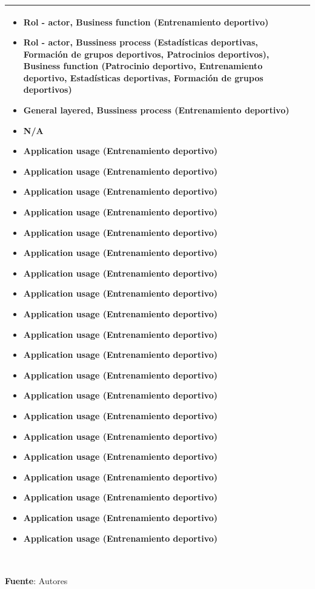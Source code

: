 \begin{table}[!htb]
\begin{center}
{\begin{tabular}{|p{7cm}|p{4cm}|}
\begin{itemize}
				\item Rol - actor, Business function (Entrenamiento deportivo) 
				\item Rol - actor, Bussiness process (Estadísticas deportivas, Formación de grupos deportivos, Patrocinios deportivos), Business function (Patrocinio deportivo, Entrenamiento deportivo, Estadísticas deportivas, Formación de grupos deportivos)
				\item General layered, Bussiness process (Entrenamiento deportivo)
				\item N/A
				\item Application usage (Entrenamiento deportivo)
				\item Application usage (Entrenamiento deportivo)
				\item Application usage (Entrenamiento deportivo)
				\item Application usage (Entrenamiento deportivo)
				\item Application usage (Entrenamiento deportivo)
				\item Application usage (Entrenamiento deportivo)
				\item Application usage (Entrenamiento deportivo)
				\item Application usage (Entrenamiento deportivo)
				\item Application usage (Entrenamiento deportivo)
				\item Application usage (Entrenamiento deportivo) 
				\item Application usage (Entrenamiento deportivo)
				\item Application usage (Entrenamiento deportivo)
				\item Application usage (Entrenamiento deportivo)
				\item Application usage (Entrenamiento deportivo)
				\item Application usage (Entrenamiento deportivo)
				\item Application usage (Entrenamiento deportivo)
				\item Application usage (Entrenamiento deportivo)
				\item Application usage (Entrenamiento deportivo)
				\item Application usage (Entrenamiento deportivo)
				\item Application usage (Entrenamiento deportivo)
			\end{itemize} 
			\\
			\hline
		\end{tabular}
		} \\
		\textbf{Fuente}: Autores
	\end{center}
\end{table}

